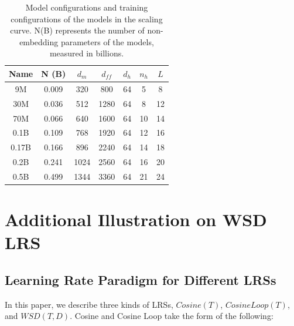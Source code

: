 \begin{table}[htbp]
    \centering
    \begin{tabular}{c|cccccc}
    \toprule
        \textbf{Name} & \textbf{N (B)}& $d_m$ & $d_{ff}$ &$d_h$ & $n_h$ & $L$ \\
    \midrule
          9M    &  0.009 & 320 & 800 & 64 & 5 & 8\\
           30M &   0.036 & 512 & 1280 & 64 & 8 & 12  \\
          70M &  0.066 & 640 & 1600 & 64 & 10 & 14\\
          0.1B &  0.109 & 768 & 1920 & 64 & 12 & 16  \\
         0.17B &  0.166 & 896 & 2240 & 64 & 14 & 18 \\
         0.2B&  0.241 & 1024 & 2560 & 64 & 16 & 20 \\
        0.5B& 0.499 & 1344 & 3360 & 64 & 21 & 24 \\
    \bottomrule
    \end{tabular}
    \caption{Model configurations and training configurations of the models in the scaling curve. N(B) represents the number of non-embedding parameters of the models, measured in billions.
    }
    \label{tab:appmodel_configs}
\end{table}

\section{Additional Illustration on WSD LRS}
\subsection{Learning Rate Paradigm for Different LRSs}
\label{app:lrsequ}
In this paper, we describe three kinds of LRSs, \uline{$Cosine(T)$}, \uline{$CosineLoop(T)$}, and \uline{$WSD(T, D)$}. 
Cosine and Cosine Loop take the form of the following:

